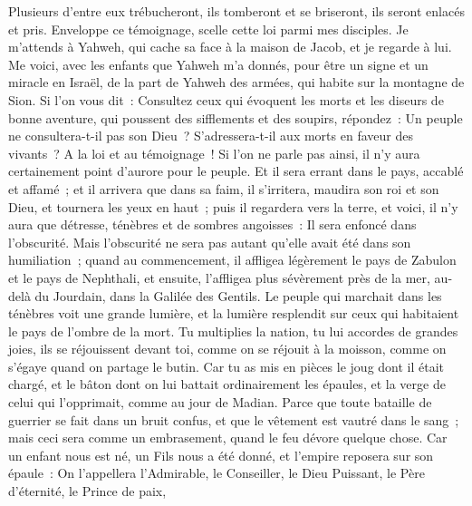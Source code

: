 \begin{multicols}{2}
Plusieurs d'entre eux trébucheront, ils tomberont et se briseront, ils seront enlacés et pris.
Enveloppe ce témoignage, scelle cette loi parmi mes disciples.
Je m'attends à Yahweh, qui cache sa face à la maison de Jacob, et je regarde à lui.
Me voici, avec les enfants que Yahweh m'a donnés, pour être un signe et un miracle en Israël, de la part de Yahweh des armées, qui habite sur la montagne de Sion.
Si l'on vous dit~: Consultez ceux qui évoquent les morts et les diseurs de bonne aventure, qui poussent des sifflements et des soupirs, répondez~: Un peuple ne consultera-t-il pas son Dieu~? S'adressera-t-il aux morts en faveur des vivants~?
A la loi et au témoignage~! Si l'on ne parle pas ainsi, il n'y aura certainement point d'aurore pour le peuple.
Et il sera errant dans le pays, accablé et affamé~; et il arrivera que dans sa faim, il s'irritera, maudira son roi et son Dieu, et tournera les yeux en haut~;
puis il regardera vers la terre, et voici, il n'y aura que détresse, ténèbres et de sombres angoisses~: Il sera enfoncé dans l'obscurité.
Mais l'obscurité ne sera pas autant qu'elle avait été dans son humiliation~; quand au commencement, il affligea légèrement le pays de Zabulon et le pays de Nephthali, et ensuite, l'affligea plus sévèrement près de la mer, au-delà du Jourdain, dans la Galilée des Gentils.
\VerseOne{}Le peuple qui marchait dans les ténèbres voit une grande lumière, et la lumière resplendit sur ceux qui habitaient le pays de l'ombre de la mort.
Tu multiplies la nation, tu lui accordes de grandes joies, ils se réjouissent devant toi, comme on se réjouit à la moisson, comme on s'égaye quand on partage le butin.
Car tu as mis en pièces le joug dont il était chargé, et le bâton dont on lui battait ordinairement les épaules, et la verge de celui qui l'opprimait, comme au jour de Madian.
Parce que toute bataille de guerrier se fait dans un bruit confus, et que le vêtement est vautré dans le sang~; mais ceci sera comme un embrasement, quand le feu dévore quelque chose.
Car un enfant nous est né, un Fils nous a été donné, et l'empire reposera sur son épaule~: On l'appellera l'Admirable, le Conseiller, le Dieu Puissant, le Père d'éternité, le Prince de paix,

\end{multicols}
